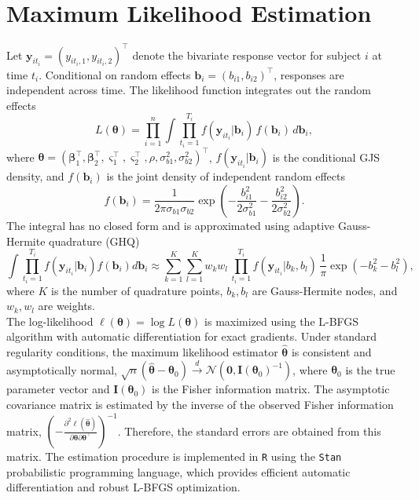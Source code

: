 \documentclass[twoside]{article}
\begin{document}
\section{Maximum Likelihood Estimation}\label{sec3}

Let $\boldsymbol{y}_{it_i} = (y_{it_i,1}, y_{it_i,2})^{\intercal}$ denote the bivariate response vector for subject $i$ at time $t_i$. Conditional on random effects $\boldsymbol{b}_i = (b_{i1}, b_{i2})^{\intercal}$, responses are independent across time. The likelihood function integrates out the random effects
\begin{equation}
	L(\boldsymbol{\theta}) = \prod_{i=1}^n \int \prod_{t_i=1}^{T_i} f(\boldsymbol{y}_{it_i}|\boldsymbol{b}_i) \, f(\boldsymbol{b}_i) \, d\boldsymbol{b}_i,
\end{equation}
where $\boldsymbol{\theta} = (\boldsymbol{\beta}_1^{\intercal}, \boldsymbol{\beta}_2^{\intercal}, \boldsymbol{\varsigma}_1^{\intercal}, \boldsymbol{\varsigma}_2^{\intercal}, \rho, \sigma_{b1}^2, \sigma_{b2}^2)^{\intercal}$, $f(\boldsymbol{y}_{it_i}|\boldsymbol{b}_i)$ is the conditional GJS density, and $f(\boldsymbol{b}_i)$ is the joint density of independent random effects
\begin{equation}
	f(\boldsymbol{b}_i) = \frac{1}{2\pi \sigma_{b1} \sigma_{b2}} \exp\left(-\frac{b_{i1}^2}{2\sigma_{b1}^2} - \frac{b_{i2}^2}{2\sigma_{b2}^2}\right).
\end{equation}
The integral has no closed form and is approximated using adaptive Gauss-Hermite quadrature (GHQ)
\begin{equation}
	\int \prod_{t_i=1}^{T_i} f(\boldsymbol{y}_{it_i}|\boldsymbol{b}_i) f(\boldsymbol{b}_i) d\boldsymbol{b}_i \approx \sum_{k=1}^{K} \sum_{l=1}^{K} w_k w_l \, \prod_{t_i=1}^{T_i} f(\boldsymbol{y}_{it_i}|b_{k}, b_{l}) \, \frac{1}{\pi} \exp(-b_k^2 - b_l^2),
\end{equation}
where $K$ is the number of quadrature points, $b_k, b_l$ are Gauss-Hermite nodes, and $w_k, w_l$ are weights.\\
The log-likelihood $\ell(\boldsymbol{\theta}) = \log L(\boldsymbol{\theta})$ is maximized using the L-BFGS algorithm with automatic differentiation for exact gradients. Under standard regularity conditions, the maximum likelihood estimator $\widehat{\boldsymbol{\theta}}$ is consistent and asymptotically normal, $\sqrt{n} (\widehat{\boldsymbol{\theta}} - \boldsymbol{\theta}_0) \xrightarrow{d} \mathcal{N}(\boldsymbol{0}, \boldsymbol{I}(\boldsymbol{\theta}_0)^{-1})$, where $\boldsymbol{\theta}_0$ is the true parameter vector and $\boldsymbol{I}(\boldsymbol{\theta}_0)$ is the Fisher information matrix. The asymptotic covariance matrix is estimated by the inverse of the observed Fisher information matrix, $ \left(-\frac{\partial^2 \ell(\widehat{\boldsymbol{\theta}})}{\partial \boldsymbol{\theta} \partial \boldsymbol{\theta}^{\intercal}}\right)^{-1}$. Therefore, the standard errors are obtained from this matrix. The estimation procedure is implemented in \texttt{R} using the \texttt{Stan} probabilistic programming language, which provides efficient automatic differentiation and robust L-BFGS optimization. 
\end{document}
